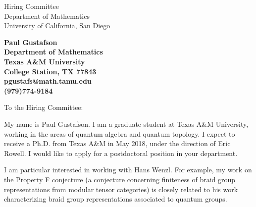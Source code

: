 \documentclass[11pt]{letter} %
\begin{document}

\begin{letter}{Hiring Committee \\
Department of Mathematics \\
University of California, San Diego}


\begin{center}
\large\bf Paul Gustafson \\ %
Department of Mathematics \\ Texas A\&M University \\ College Station, TX 77843 \\ pgustafs@math.tamu.edu \\ (979)774-9184 %
\end{center} 
\vfill



\opening{To the Hiring Committee:}

My name is Paul Gustafson. I am a graduate student at Texas A\&M University, working in the areas of quantum algebra and quantum topology. I expect to receive a Ph.D. from Texas A\&M in May 2018, under the direction of Eric Rowell. I would like to apply for a postdoctoral position in your department.

I am particular interested in working with Hans Wenzl.  For example, my work on the Property F conjecture (a conjecture concerning finiteness of braid group representations from modular tensor categories) is closely related to his work characterizing braid group representations associated to quantum groups.


\end{letter}
\end{document}
